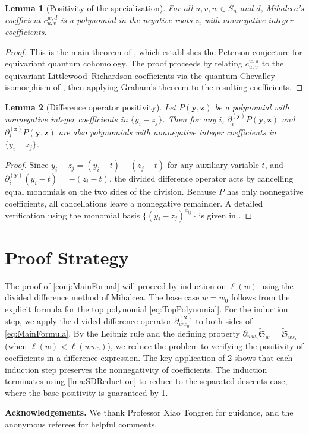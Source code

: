 \documentclass[12pt]{amsart}
\newtheorem{Lemma}{Lemma}
\begin{document}
\begin{Lemma}[Positivity of the specialization]\label{lma:MihalceaPositivity}
For all $u,v,w\in S_n$ and $d$, Mihalcea's coefficient
$c_{u,v}^{w,d}$ is a polynomial in the negative roots $z_i$ with
nonnegative integer coefficients.
\end{Lemma}

\begin{proof}
This is the main theorem of \cite{Mihalcea}, which establishes the Peterson
conjecture for equivariant quantum cohomology. The proof proceeds by relating
$c_{u,v}^{w,d}$ to the equivariant Littlewood--Richardson coefficients via the
quantum Chevalley isomorphism of \cite{Kim2000}, then applying Graham's theorem
to the resulting coefficients.
\end{proof}

\begin{Lemma}[Difference operator positivity]\label{lma:DifferencePositivity}
Let $P(\mathbf{y},\mathbf{z})$ be a polynomial with nonnegative integer coefficients
in $\{y_i-z_j\}$. Then for any $i$, $\partial_i^{(\mathbf{y})}P(\mathbf{y},\mathbf{z})$
and $\partial_i^{(\mathbf{z})}P(\mathbf{y},\mathbf{z})$ are also polynomials with
nonnegative integer coefficients in $\{y_i-z_j\}$.
\end{Lemma}

\begin{proof}
Since $y_i-z_j = (y_i-t)-(z_j-t)$ for any auxiliary variable $t$, and
$\partial_i^{(\mathbf{y})}(y_i-t)=-(z_i-t)$, the divided difference operator
acts by cancelling equal monomials on the two sides of the division.
Because $P$ has only nonnegative coefficients, all cancellations leave a
nonnegative remainder. A detailed verification using the monomial basis
$\{(y_i-z_j)^{a_{ij}}\}$ is given in \cite[Section 4]{GX2025}.
\end{proof}

\section{Proof Strategy}
\label{sec:proof-strategy}

The proof of \cref{conj:MainFormal} will proceed by induction on $\ell(w)$
using the divided difference method of Mihalcea.
The base case $w=w_0$ follows from the explicit formula for the top polynomial
\cref{eq:TopPolynomial}.
For the induction step, we apply the divided difference operator
$\partial_{ww_0}^{(\mathbf{x})}$ to both sides of \cref{eq:MainFormula}.
By the Leibniz rule and the defining property
$\partial_{ww_0}\widetilde{\mathfrak{S}}_w = \widetilde{\mathfrak{S}}_{ws_i}$
(when $\ell(w)<\ell(ww_0)$), we reduce the problem to verifying the
positivity of coefficients in a difference expression.
The key application of \cref{lma:DifferencePositivity} shows that each
induction step preserves the nonnegativity of coefficients.
The induction terminates using \cref{lma:SDReduction} to reduce to
the separated descents case, where the base positivity is guaranteed by
\cref{lma:MihalceaPositivity}.

\bigskip

\textbf{Acknowledgements.} We thank Professor Xiao Tongren for guidance,
and the anonymous referees for helpful comments.


\end{document}
